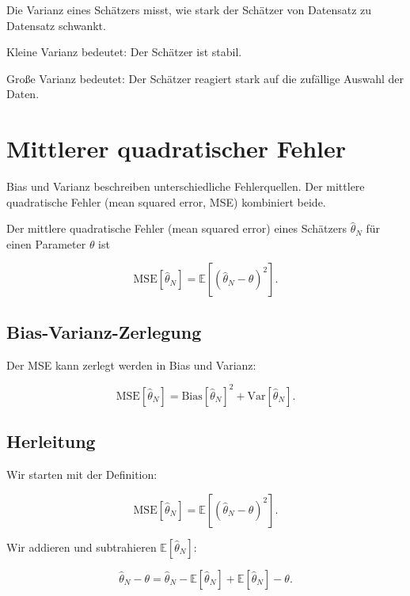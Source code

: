 \begin{conceptbox}
Die Varianz eines Schätzers misst, wie stark der Schätzer von Datensatz zu Datensatz schwankt.

Kleine Varianz bedeutet:
Der Schätzer ist stabil.

Große Varianz bedeutet:
Der Schätzer reagiert stark auf die zufällige Auswahl der Daten.
\end{conceptbox}

\section{Mittlerer quadratischer Fehler}

Bias und Varianz beschreiben unterschiedliche Fehlerquellen.
Der mittlere quadratische Fehler (mean squared error, MSE) kombiniert beide.

\begin{definitionbox}
Der mittlere quadratische Fehler (mean squared error) eines Schätzers \(\hat{\theta}_N\) für einen Parameter \(\theta\) ist

\[
    \mathrm{MSE}[\hat{\theta}_N]
    =
    \mathbb{E}\left[
        \left(
            \hat{\theta}_N - \theta
        \right)^2
    \right].
\]
\end{definitionbox}

\subsection{Bias-Varianz-Zerlegung}

Der MSE kann zerlegt werden in Bias und Varianz:

\[
    \mathrm{MSE}[\hat{\theta}_N]
    =
    \mathrm{Bias}[\hat{\theta}_N]^2
    +
    \mathrm{Var}[\hat{\theta}_N].
\]

\subsection{Herleitung}

Wir starten mit der Definition:

\[
    \mathrm{MSE}[\hat{\theta}_N]
    =
    \mathbb{E}\left[
        \left(
            \hat{\theta}_N-\theta
        \right)^2
    \right].
\]

Wir addieren und subtrahieren \(\mathbb{E}[\hat{\theta}_N]\):

\[
    \hat{\theta}_N-\theta
    =
    \hat{\theta}_N
    -
    \mathbb{E}[\hat{\theta}_N]
    +
    \mathbb{E}[\hat{\theta}_N]
    -
    \theta.
\]

